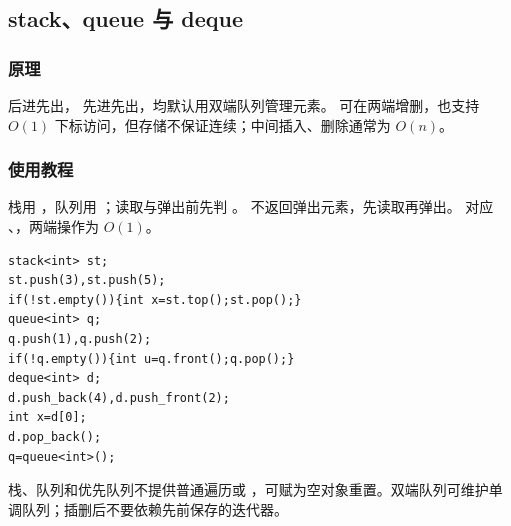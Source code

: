 \subsection{stack、queue 与 deque}
\label{stl:queue}
\subsubsection*{原理}
 后进先出， 先进先出，均默认用双端队列管理元素。 可在两端增删，也支持 $O(1)$ 下标访问，但存储不保证连续；中间插入、删除通常为 $O(n)$。
\subsubsection*{使用教程}
栈用 ，队列用 ；读取与弹出前先判 。 不返回弹出元素，先读取再弹出。 对应 、，两端操作为 $O(1)$。
\begin{lstlisting}[style=mtycpp,numbers=none]
stack<int> st;
st.push(3),st.push(5);
if(!st.empty()){int x=st.top();st.pop();}
queue<int> q;
q.push(1),q.push(2);
if(!q.empty()){int u=q.front();q.pop();}
deque<int> d;
d.push_back(4),d.push_front(2);
int x=d[0];
d.pop_back();
q=queue<int>();
\end{lstlisting}
栈、队列和优先队列不提供普通遍历或 ，可赋为空对象重置。双端队列可维护单调队列；插删后不要依赖先前保存的迭代器。
